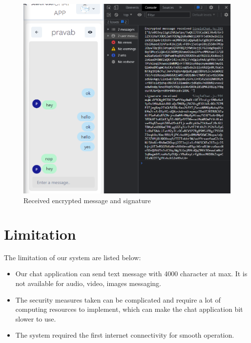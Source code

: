 \begin{figure}[H]
	\centering
	\includegraphics[width=160mm]{images/msg.png}
	\caption{Received encrypted message and signature}
	\label{figencryptedmsg} %
\end{figure}



\section{Limitation}
The limitation of our system are listed below:
\vspace{-18pt}
\begin{itemize}
	\item Our chat application can send text message with 4000 character  at max. It is not available for audio, video, images messaging.
	\item The security measures taken can be complicated and require a lot of computing resources to implement, which can make the chat application bit slower to use.
	\item The system required the first internet connectivity for smooth operation.
\end{itemize}
